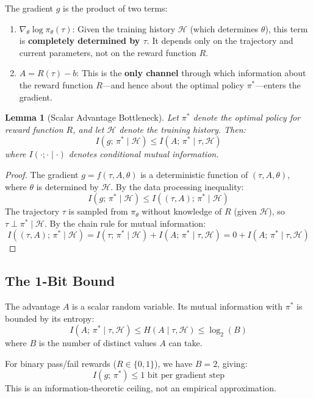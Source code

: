 \documentclass[11pt,a4paper]{article}
\newtheorem{lemma}[theorem]{Lemma}
\theoremstyle{definition}
\theoremstyle{remark}
\newcommand{\calH}{\mathcal{H}}
\begin{document}
The gradient $g$ is the product of two terms:
\begin{enumerate}
    \item $\nabla_\theta \log \pi_\theta(\tau)$: Given the training history $\calH$ (which determines $\theta$), this term is \textbf{completely determined by $\tau$}. It depends only on the trajectory and current parameters, not on the reward function $R$.

    \item $A = R(\tau) - b$: This is the \textbf{only channel} through which information about the reward function $R$---and hence about the optimal policy $\pi^*$---enters the gradient.
\end{enumerate}

\begin{lemma}[Scalar Advantage Bottleneck]
\label{lem:bottleneck}
Let $\pi^*$ denote the optimal policy for reward function $R$, and let $\calH$ denote the training history. Then:
\[
I(g;\, \pi^* \mid \calH) \leq I(A;\, \pi^* \mid \tau, \calH)
\]
where $I(\cdot; \cdot \mid \cdot)$ denotes conditional mutual information.
\end{lemma}

\begin{proof}
The gradient $g = f(\tau, A, \theta)$ is a deterministic function of $(\tau, A, \theta)$, where $\theta$ is determined by $\calH$. By the data processing inequality:
\[
I(g;\, \pi^* \mid \calH) \leq I((\tau, A);\, \pi^* \mid \calH)
\]
The trajectory $\tau$ is sampled from $\pi_\theta$ without knowledge of $R$ (given $\calH$), so $\tau \perp \pi^* \mid \calH$. By the chain rule for mutual information:
\[
I((\tau, A);\, \pi^* \mid \calH) = I(\tau;\, \pi^* \mid \calH) + I(A;\, \pi^* \mid \tau, \calH) = 0 + I(A;\, \pi^* \mid \tau, \calH)
\]
\end{proof}

\subsection{The 1-Bit Bound}

The advantage $A$ is a scalar random variable. Its mutual information with $\pi^*$ is bounded by its entropy:
\[
I(A;\, \pi^* \mid \tau, \calH) \leq H(A \mid \tau, \calH) \leq \log_2(B)
\]
where $B$ is the number of distinct values $A$ can take.

\begin{keyresult}
For binary pass/fail rewards ($R \in \{0, 1\}$), we have $B = 2$, giving:
\[
I(g;\, \pi^*) \leq 1 \text{ bit per gradient step}
\]
This is an information-theoretic ceiling, not an empirical approximation.
\end{keyresult}
\end{document}
